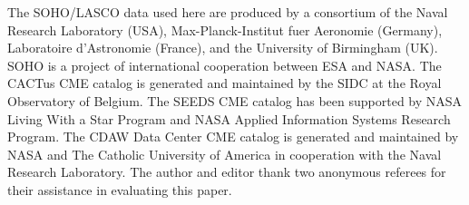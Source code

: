 \documentclass[referee,a4paper,12pt,traditabstract]{swsc}
\begin{document}
\begin{linenumbers}
\begin{acknowledgements}
The SOHO/LASCO data used here are produced by a consortium of the Naval Research Laboratory (USA), Max-Planck-Institut fuer Aeronomie (Germany), Laboratoire d'Astronomie (France), and the University of Birmingham (UK). SOHO is a project of international cooperation between ESA and NASA.
The CACTus CME catalog is generated and maintained by the SIDC at the Royal Observatory of Belgium.
The SEEDS CME catalog has been supported by NASA Living With a Star Program and NASA Applied Information Systems Research Program.
The CDAW Data Center CME catalog is generated and maintained by NASA and The Catholic University of America in cooperation with the Naval Research Laboratory.
The author and editor thank two anonymous referees for their assistance in evaluating this paper.      
     
\end{acknowledgements}


%

  

\end{linenumbers}
\end{document}
